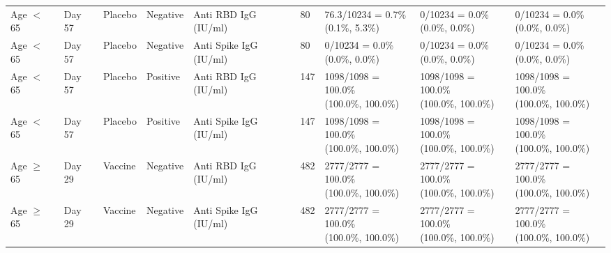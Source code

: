 \documentclass[]{book}
\theoremstyle{definition}
\theoremstyle{definition}
\theoremstyle{definition}
\newcommand{\1}{\mathbbm{1}}
\begin{document}
\begin{landscape}
\begin{ThreePartTable}
\begin{longtable}[t]{>{\raggedright\arraybackslash}p{2.7cm}llllllll}
\hspace{1em}Age $<$ 65 & Day 57 & Placebo & Negative & Anti RBD IgG (IU/ml) & 80 & \makecell[l]{76.3/10234 = 0.7\%\\(0.1\%, 5.3\%)} & \makecell[l]{0/10234 = 0.0\%\\(0.0\%, 0.0\%)} & \makecell[l]{0/10234 = 0.0\%\\(0.0\%, 0.0\%)}\\
\hspace{1em}Age $<$ 65 & Day 57 & Placebo & Negative & Anti Spike IgG (IU/ml) & 80 & \makecell[l]{0/10234 = 0.0\%\\(0.0\%, 0.0\%)} & \makecell[l]{0/10234 = 0.0\%\\(0.0\%, 0.0\%)} & \makecell[l]{0/10234 = 0.0\%\\(0.0\%, 0.0\%)}\\
\hspace{1em}Age $<$ 65 & Day 57 & Placebo & Positive & Anti RBD IgG (IU/ml) & 147 & \makecell[l]{1098/1098 = 100.0\%\\(100.0\%, 100.0\%)} & \makecell[l]{1098/1098 = 100.0\%\\(100.0\%, 100.0\%)} & \makecell[l]{1098/1098 = 100.0\%\\(100.0\%, 100.0\%)}\\
\hspace{1em}Age $<$ 65 & Day 57 & Placebo & Positive & Anti Spike IgG (IU/ml) & 147 & \makecell[l]{1098/1098 = 100.0\%\\(100.0\%, 100.0\%)} & \makecell[l]{1098/1098 = 100.0\%\\(100.0\%, 100.0\%)} & \makecell[l]{1098/1098 = 100.0\%\\(100.0\%, 100.0\%)}\\
\hspace{1em}Age $\geq$ 65 & Day 29 & Vaccine & Negative & Anti RBD IgG (IU/ml) & 482 & \makecell[l]{2777/2777 = 100.0\%\\(100.0\%, 100.0\%)} & \makecell[l]{2777/2777 = 100.0\%\\(100.0\%, 100.0\%)} & \makecell[l]{2777/2777 = 100.0\%\\(100.0\%, 100.0\%)}\\
\hspace{1em}Age $\geq$ 65 & Day 29 & Vaccine & Negative & Anti Spike IgG (IU/ml) & 482 & \makecell[l]{2777/2777 = 100.0\%\\(100.0\%, 100.0\%)} & \makecell[l]{2777/2777 = 100.0\%\\(100.0\%, 100.0\%)} & \makecell[l]{2777/2777 = 100.0\%\\(100.0\%, 100.0\%)}\\

\end{longtable}
\end{ThreePartTable}
\end{landscape}
\end{document}
